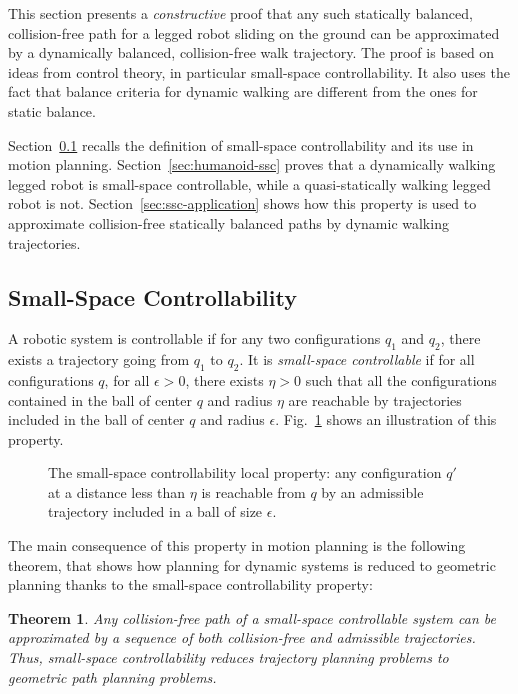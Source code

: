 \documentclass{article}
\newtheorem{theorem}{Theorem}
\begin{document}
This section presents a \textit{constructive} proof that any such statically balanced, 
collision-free path for a legged robot sliding
on the ground can be approximated by a  dynamically balanced, collision-free walk trajectory.
The proof is based on ideas from control theory, in particular small-space 
controllability. It also uses the fact that balance criteria for dynamic walking are different
from the ones for static balance. 

Section~\ref{sec:ssc} recalls the definition of small-space controllability and its
use in motion planning. Section~\ref{sec:humanoid-ssc} proves that a
dynamically walking legged robot is small-space controllable, while a quasi-statically
walking legged robot is not. Section~\ref{sec:ssc-application} shows how this property is used to
approximate collision-free statically balanced paths by dynamic walking trajectories.


\subsection{Small-Space Controllability}
\label{sec:ssc} 

A  robotic system  is  controllable  if  for any two  configurations
$q_1$ and $q_2$,  there exists  a
trajectory  going  from  $q_1$ to  $q_2$.  It  is  
\textit{small-space  controllable} if for all configurations  $q$, 
for all $\epsilon >0$, there
exists $\eta >0$ such that all the configurations contained in the ball of center
$q$ and radius $\eta$ are reachable by trajectories included in the
ball of center $q$ and radius $\epsilon$. Fig.~\ref{fig:ssc1} shows an illustration
of this property.

\begin{figure}[h]
  \centering
  

  \caption{The small-space controllability local property:  any configuration $q'$ 
    at a distance less than
    $\eta$ is reachable from $q$ by an admissible trajectory included in
    a ball of size $\epsilon$.}
  \label{fig:ssc1}
\end{figure}

The main  consequence of  this property  
in  motion planning  is the following theorem, that shows how planning for
dynamic systems is reduced to geometric planning
thanks to the small-space controllability property:

\begin{theorem}
  \label{thm:ssc}
  Any collision-free path of a small-space controllable system can be approximated
  by a sequence of both collision-free and admissible trajectories. Thus, small-space 
  controllability reduces trajectory planning problems to geometric path planning problems.
\end{theorem}
\end{document}
